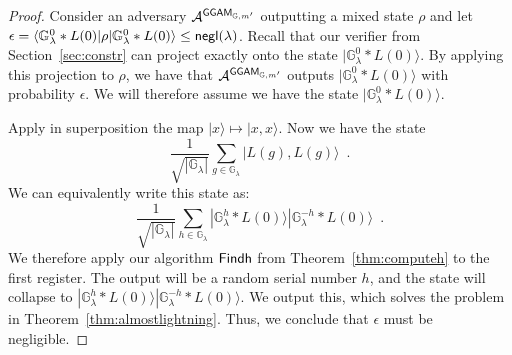 \documentclass{article}\usepackage[a4paper,margin=20mm]{geometry}
\numberwithin{theorem}{section}
\numberwithin{equation}{section}
\newcommand{\G}{\mathbb{G}}
\newcommand{\As}{{\mathcal{A}}}
\newcommand{\negl}{{\sf negl}}
\newcommand{\GGAM}{{\sf GGAM}}
\begin{document}
\begin{proof} Consider an adversary $\As^{\GGAM_{\G,m'}}$ outputting a mixed state $\rho$ and let $\epsilon=\langle\G^0_\lambda*L(0)|\rho|\G^0_\lambda*L(0)\rangle\leq\negl(\lambda)$. Recall that our verifier from Section~\ref{sec:constr} can project exactly onto the state $|\G^0_\lambda*L(0)\rangle$. By applying this projection to $\rho$, we have that $\As^{\GGAM_{\G,m'}}$ outputs $|\G^0_\lambda*L(0)\rangle$ with probability $\epsilon$. We will therefore assume we have the state $|\G^0_\lambda*L(0)\rangle$.
	
	Apply in superposition the map $|x\rangle\mapsto|x,x\rangle$. Now we have the state 
	\[\frac{1}{\sqrt{|\G_\lambda|}}\sum_{g\in\G_\lambda}|L(g),L(g)\rangle\enspace .\]
	We can equivalently write this state as:
	\[\frac{1}{\sqrt{|\G_\lambda|}}\sum_{h\in\G_\lambda}|\G^h_\lambda*L(0)\rangle|\G^{-h}_\lambda*L(0)\rangle\enspace .\]
	We therefore apply our algorithm ${\sf Findh}$ from Theorem~\ref{thm:computeh} to the first register. The output will be a random serial number $h$, and the state will collapse to $|\G^h_\lambda*L(0)\rangle|\G^{-h}_\lambda*L(0)\rangle$. We output this, which solves the problem in Theorem~\ref{thm:almostlightning}. Thus, we conclude that $\epsilon$ must be negligible.
\end{proof}
\end{document}
